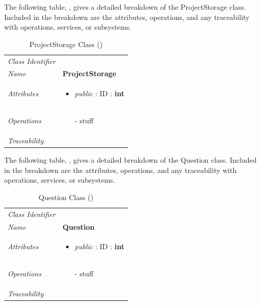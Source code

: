 \documentclass[12pt,letterpaper]{article}
\begin{document}
The following table, , gives a detailed breakdown of the ProjectStorage class. Included in the breakdown are the attributes, operations, and any traceability with operations, services, or subsystems.

\begin{table}[H]
    \caption{ProjectStorage Class ()} 
	\begin{tabu} to 
		\toprule
		Class Identifier &  \\
		Name & {\bf ProjectStorage} \\
		Attributes & 
		\begin{minipage}[t]{\linewidth}
		    \begin{itemize}
		        \item \textit{public} : ID : \bf{int}
			\end{itemize}
	    \end{minipage} \\

		Operations &
		\begin{minipage}[t]{\linewidth}
			\begin{enumerate}
			    \item[-] stuff
	        \end{enumerate}
	    \end{minipage} \\
	    	Traceability & \\
		\toprule
	\end{tabu}
\end{table}

The following table, , gives a detailed breakdown of the Question class. Included in the breakdown are the attributes, operations, and any traceability with operations, services, or subsystems.

\begin{table}[H]
    \caption{Question Class ()} 
	\begin{tabu} to 
		\toprule
		Class Identifier &  \\
		Name & {\bf Question} \\
		Attributes & 
		\begin{minipage}[t]{\linewidth}
		    \begin{itemize}
		        \item \textit{public} : ID : \bf{int}
			\end{itemize}
	    \end{minipage} \\

		Operations &
		\begin{minipage}[t]{\linewidth}
			\begin{enumerate}
			    \item[-] stuff
	        \end{enumerate}
	    \end{minipage} \\
	    	Traceability & \\
		\toprule
	\end{tabu}
\end{table}
\end{document}
